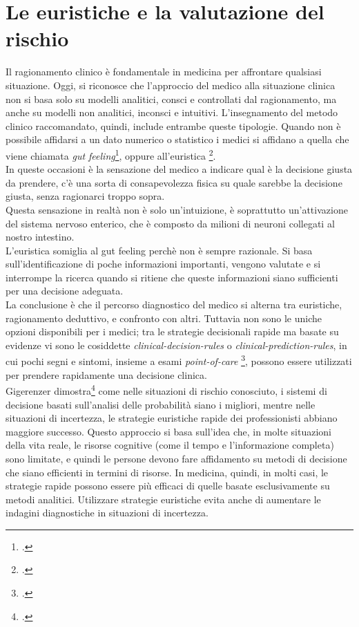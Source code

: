\section{Le euristiche e la valutazione del rischio}

Il ragionamento clinico è fondamentale in medicina per affrontare qualsiasi situazione. Oggi, si riconosce che l'approccio del medico alla situazione clinica non si basa solo su modelli analitici, consci e controllati dal ragionamento, ma anche su modelli non analitici, inconsci e intuitivi. L'insegnamento del metodo clinico raccomandato, quindi, include entrambe queste tipologie. Quando non è possibile affidarsi a un dato numerico o statistico i medici si affidano a quella che viene chiamata \textit{gut feeling}\footcite{womak:arte-probabilita-coen}, oppure all'euristica \footcite{womak:recenti-progressi-medicina}.\\
In queste occasioni è la sensazione del medico a indicare qual è la decisione giusta da prendere, c'è una sorta di consapevolezza fisica su quale sarebbe la decisione giusta, senza ragionarci troppo sopra.\\
Questa sensazione in realtà non è solo un'intuizione, è soprattutto un'attivazione del sistema nervoso enterico, che è composto da milioni di neuroni collegati al nostro intestino. \\
L'euristica somiglia al gut feeling perchè non è sempre razionale. Si basa sull'identificazione di poche informazioni importanti, vengono valutate e si interrompe la ricerca quando si ritiene che queste informazioni siano sufficienti per una decisione adeguata.\\

La conclusione è che il percorso diagnostico del medico si alterna tra euristiche, ragionamento deduttivo, e confronto con altri. Tuttavia non sono le uniche opzioni disponibili per i medici; tra le strategie decisionali rapide ma basate su evidenze vi sono le cosiddette \textit{\gls{clinical-decision-rules}} o \textit{\gls{clinical-prediction-rules}}, in cui pochi segni e sintomi, insieme a esami \textit{\gls{point-of-care}} \footcite{womak:recenti-progressi-medicina}, possono essere utilizzati per prendere rapidamente una decisione clinica. \\

Gigerenzer dimostra\footcite{womak:gigerenzer-euristiche} come nelle situazioni di rischio conosciuto, i sistemi di decisione basati sull'analisi delle probabilità siano i migliori, mentre nelle situazioni di incertezza, le strategie euristiche rapide dei professionisti abbiano maggiore successo. Questo approccio si basa sull'idea che, in molte situazioni della vita reale, le risorse cognitive (come il tempo e l'informazione completa) sono limitate, e quindi le persone devono fare affidamento su metodi di decisione che siano efficienti in termini di risorse. In medicina, quindi, in molti casi, le strategie rapide possono essere più efficaci di quelle basate esclusivamente su metodi analitici. Utilizzare strategie euristiche evita anche di aumentare le indagini diagnostiche in situazioni di incertezza.\\


